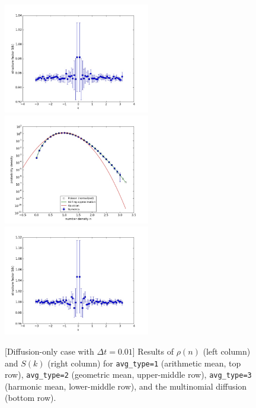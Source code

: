 \documentclass{article}
\begin{document}
\begin{figure}
\includegraphics[width=0.5\linewidth,height=1.9in]{fig1/appendix_dt0.01_diff_Sk_avg3.jpg}
\includegraphics[width=0.5\linewidth,height=1.9in]{fig1/appendix_dt0.01_diff_hist_mn.jpg}
\includegraphics[width=0.5\linewidth,height=1.9in]{fig1/appendix_dt0.01_diff_Sk_mn.jpg}
\caption{\label{fig_appendix_diff_avg_type}[Diffusion-only case with $\Delta t=0.01$] Results of $\rho(n)$ (left column) and $S(k)$ (right column) for \texttt{avg\_type=1} (arithmetic mean, top row), \texttt{avg\_type=2} (geometric mean, upper-middle row), \texttt{avg\_type=3} (harmonic mean, lower-middle row), and the multinomial diffusion (bottom row).
}
\end{figure}
\end{document}
